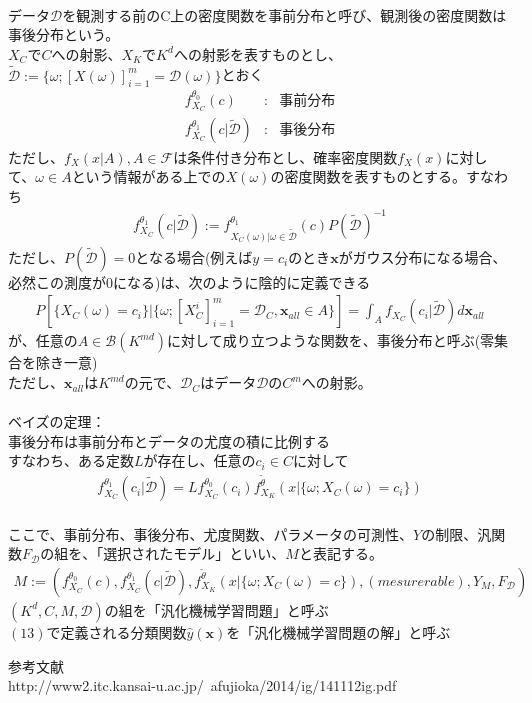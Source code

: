 \documentclass{jsarticle}
\begin{document}
 　\\
データ$\mathcal{D}$を観測する前のC上の密度関数を事前分布と呼び、観測後の密度関数は事後分布という。\\
$X_C$で$C$への射影、$X_K$で$K^d$への射影を表すものとし、$\tilde{\mathcal{D}}:=\{\omega;[X(\omega)]_{i=1}^m=\mathcal{D}(\omega)\}$とおく
\begin{eqnarray}
f^{\theta_0}_{X_C}(c)&:&事前分布\\
f^{\theta_1}_{X_C}(c|\tilde{\mathcal{D}})&:&事後分布
\end{eqnarray}
ただし、$f_X(x|A),A\in\mathcal{F}$は条件付き分布とし、確率密度関数$f_X(x)$に対して、$\omega\in A$という情報がある上での$X(\omega)$の密度関数を表すものとする。すなわち
\begin{eqnarray}
f^{\theta_1}_{X_C}(c|\tilde{\mathcal{D}}):=f^{\theta_1}_{X_C(\omega)|\omega\in\tilde{\mathcal{D}}}(c)P(\tilde{\mathcal{D}})^{-1}
\end{eqnarray}
ただし、$P(\tilde{\mathcal{D}})=0$となる場合(例えば$y=c_i$のとき$\bm{x}$がガウス分布になる場合、必然この測度が$0$になる)は、次のように陰的に定義できる
\begin{eqnarray}
P[\{X_C(\omega)=c_i\}|\{\omega;[X^i_C]^m_{i=1}=\mathcal{D}_C,\bm{x}_{all}\in A\}]=\int_Af_{X_C}(c_i|\tilde{\mathcal{D}})d\bm{x}_{all}
\end{eqnarray}
が、任意の$A\in\mathcal{B}(K^{md})$に対して成り立つような関数を、事後分布と呼ぶ(零集合を除き一意)\\
ただし、$\bm{x}_{all}$は$K^{md}$の元で、$\mathcal{D}_C$はデータ$\mathcal{D}$の$C^m$への射影。\\
　\\
ベイズの定理：\\
事後分布は事前分布とデータの尤度の積に比例する\\
すなわち、ある定数$L$が存在し、任意の$c_i\in C$に対して
\begin{eqnarray}
f^{\theta_1}_{X_C}(c_i|\tilde{\mathcal{D}})=Lf^{\theta_0}_{X_C}(c_i)f^{\tilde{\theta}}_{X_K}(x|\{\omega;X_C(\omega)=c_i\})
\end{eqnarray}
　\\
ここで、事前分布、事後分布、尤度関数、パラメータの可測性、$Y$の制限、汎関数$F_\mathcal{D}$の組を、「選択されたモデル」といい、$M$と表記する。\\
\begin{eqnarray}
M:=(f^{\theta_0}_{X_C}(c),f^{\theta_1}_{X_C}(c|\tilde{\mathcal{D}}),f^{\tilde{\theta}}_{X_K}(x|\{\omega;X_C(\omega)=c\}), (mesurerable),Y_M,F_\mathcal{D})
\end{eqnarray}
$(K^d,C,M,\mathcal{D})$の組を「汎化機械学習問題」と呼ぶ\\
$(13)$で定義される分類関数$\hat{y}(\bm{x})$を「汎化機械学習問題の解」と呼ぶ
\newpage

参考文献\\
http://www2.itc.kansai-u.ac.jp/~afujioka/2014/ig/141112ig.pdf
\end{document}
